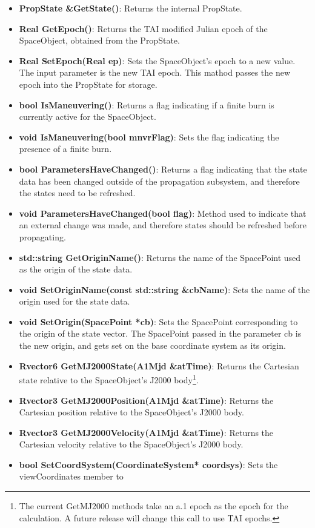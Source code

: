 \begin{itemize}
\item \textbf{PropState \&GetState()}:  Returns the internal PropState.
\item \textbf{Real GetEpoch()}: Returns the TAI modified Julian epoch of the SpaceObject, obtained
from the PropState.
\item \textbf{Real SetEpoch(Real ep)}: Sets the SpaceObject's epoch to a new value.  The input
parameter is the new TAI epoch.  This mathod passes the new epoch into the PropState for storage.
\item \textbf{bool IsManeuvering()}:  Returns a flag indicating if a finite burn is currently active
for the SpaceObject.
\item \textbf{void IsManeuvering(bool mnvrFlag)}:  Sets the flag indicating the presence of a finite
burn.
\item \textbf{bool ParametersHaveChanged()}:  Returns a flag indicating that the state data has been
changed outside of the propagation subsystem, and therefore the states need to be refreshed.
\item \textbf{void ParametersHaveChanged(bool flag)}:  Method used to indicate that an external
change was made, and therefore states should be refreshed before propagating.
\item \textbf{std::string GetOriginName()}:  Returns the name of the SpacePoint used as the origin
of the state data.
\item \textbf{void SetOriginName(const std::string \&cbName)}:  Sets the name of the origin used for
the state data.
\item \textbf{void SetOrigin(SpacePoint *cb)}:  Sets the SpacePoint corresponding to the origin of
the state vector.  The SpacePoint passed in the parameter cb is the new origin, and gets set on the
base coordinate system as its origin.
\item \textbf{Rvector6 GetMJ2000State(A1Mjd \&atTime)}:  Returns the Cartesian state relative to the
SpaceObject's J2000 body\footnote{The current GetMJ2000 methods take an a.1 epoch as the epoch for
the calculation.  A future release will change this call to use TAI epochs.}.
\item \textbf{Rvector3 GetMJ2000Position(A1Mjd \&atTime)}:  Returns the Cartesian position relative
to the SpaceObject's J2000 body.
\item \textbf{Rvector3 GetMJ2000Velocity(A1Mjd \&atTime)}:  Returns the Cartesian velocity relative
to the SpaceObject's J2000 body.
\item \textbf{bool SetCoordSystem(CoordinateSystem* coordsys)}:  Sets the viewCoordinates member to

\end{itemize}
